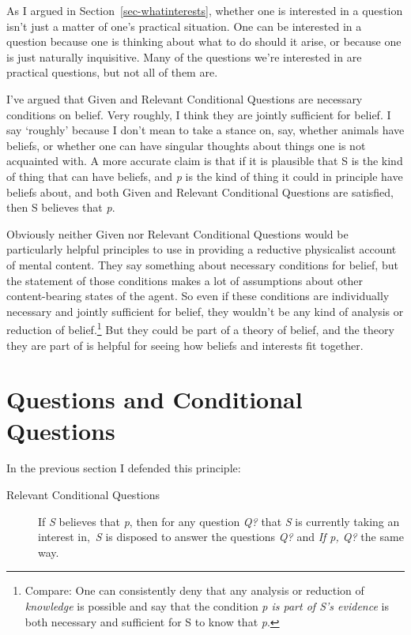 \documentclass[
  12pt,
  letterpaper,
]{scrbook}
\begin{document}
As I argued in Section~\ref{sec-whatinterests}, whether one is
interested in a question isn't just a matter of one's practical
situation. One can be interested in a question because one is thinking
about what to do should it arise, or because one is just naturally
inquisitive. Many of the questions we're interested in are practical
questions, but not all of them are.

I've argued that Given and Relevant Conditional Questions are necessary
conditions on belief. Very roughly, I think they are jointly sufficient
for belief. I say `roughly' because I don't mean to take a stance on,
say, whether animals have beliefs, or whether one can have singular
thoughts about things one is not acquainted with. A more accurate claim
is that if it is plausible that S is the kind of thing that can have
beliefs, and \emph{p} is the kind of thing it could in principle have
beliefs about, and both Given and Relevant Conditional Questions are
satisfied, then S believes that \emph{p}.

Obviously neither Given nor Relevant Conditional Questions would be
particularly helpful principles to use in providing a reductive
physicalist account of mental content. They say something about
necessary conditions for belief, but the statement of those conditions
makes a lot of assumptions about other content-bearing states of the
agent. So even if these conditions are individually necessary and
jointly sufficient for belief, they wouldn't be any kind of analysis or
reduction of belief.\footnote{Compare: One can consistently deny that
  any analysis or reduction of \emph{knowledge} is possible and say that
  the condition \emph{p is part of S's evidence} is both necessary and
  sufficient for S to know that \emph{p}.} But they could be part of a
theory of belief, and the theory they are part of is helpful for seeing
how beliefs and interests fit together.

\section{Questions and Conditional Questions}\label{sec-questions}

In the previous section I defended this principle:

\begin{description}
\item[Relevant Conditional Questions]
If \emph{S} believes that \emph{p}, then for any question \emph{Q?} that
\emph{S} is currently taking an interest in,~\emph{S} is disposed to
answer the questions \emph{Q?} and \emph{If p, Q?} the same way.
\end{description}
\end{document}
